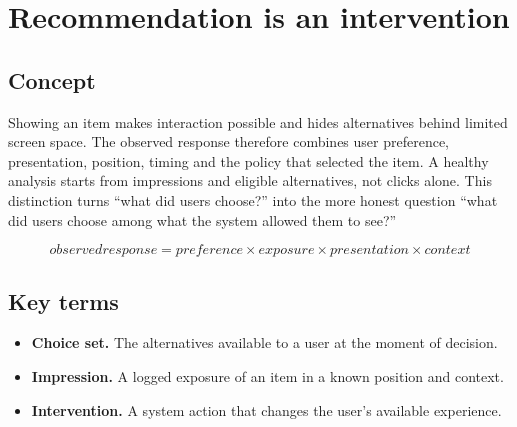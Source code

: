 \section{Recommendation is an intervention}

\begin{abstract}
A recommendation does not reveal a fixed preference; it changes the choice set.
\end{abstract}

\subsection{Concept}
Showing an item makes interaction possible and hides alternatives behind limited screen space. The observed response therefore combines user preference, presentation, position, timing and the policy that selected the item. A healthy analysis starts from impressions and eligible alternatives, not clicks alone. This distinction turns “what did users choose?” into the more honest question “what did users choose among what the system allowed them to see?”

\begin{equation*}
observed response = preference × exposure × presentation × context
\end{equation*}

\subsection{Key terms}
\begin{itemize}
\item \textbf{Choice set.} The alternatives available to a user at the moment of decision.
\item \textbf{Impression.} A logged exposure of an item in a known position and context.
\item \textbf{Intervention.} A system action that changes the user’s available experience.
\end{itemize}
